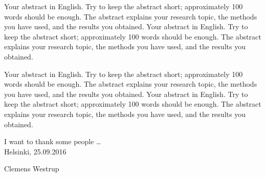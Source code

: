 \makecoverpage

\begin{abstractpage}[english]
  Your abstract in English. Try to keep the abstract short; approximately
  100 words should be enough. The abstract explains your research topic,
  the methods you have used, and the results you obtained.
  Your abstract in English. Try to keep the abstract short; approximately
  100 words should be enough. The abstract explains your research topic,
  the methods you have used, and the results you obtained.

  Your abstract in English. Try to keep the abstract short; approximately
  100 words should be enough. The abstract explains your research topic,
  the methods you have used, and the results you obtained.
  Your abstract in English. Try to keep the abstract short; approximately
  100 words should be enough. The abstract explains your research topic,
  the methods you have used, and the results you obtained.
\end{abstractpage}

\newpage




%

I want to thank some people \ldots
\\

\vspace{5cm}
Helsinki, 25.09.2016

\vspace{5mm}
{\hfill Clemens Westrup \hspace{1cm}}

\newpage

\thesistableofcontents
\clearpage

